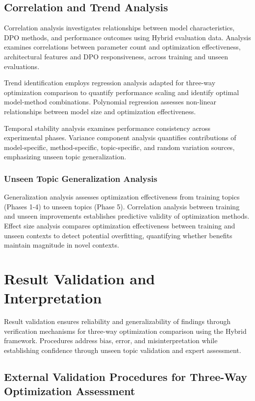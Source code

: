 \subsection{Correlation and Trend Analysis}

Correlation analysis investigates relationships between model characteristics, DPO methods, and performance outcomes using Hybrid evaluation data. Analysis examines correlations between parameter count and optimization effectiveness, architectural features and DPO responsiveness, across training and unseen evaluations.

Trend identification employs regression analysis adapted for three-way optimization comparison to quantify performance scaling and identify optimal model-method combinations. Polynomial regression assesses non-linear relationships between model size and optimization effectiveness.

Temporal stability analysis examines performance consistency across experimental phases. Variance component analysis quantifies contributions of model-specific, method-specific, topic-specific, and random variation sources, emphasizing unseen topic generalization.

\subsubsection{Unseen Topic Generalization Analysis}

Generalization analysis assesses optimization effectiveness from training topics (Phases 1-4) to unseen topics (Phase 5). Correlation analysis between training and unseen improvements establishes predictive validity of optimization methods. Effect size analysis compares optimization effectiveness between training and unseen contexts to detect potential overfitting, quantifying whether benefits maintain magnitude in novel contexts.

\section{Result Validation and Interpretation}
\label{sec:result-validation}

Result validation ensures reliability and generalizability of findings through verification mechanisms for three-way optimization comparison using the Hybrid framework. Procedures address bias, error, and misinterpretation while establishing confidence through unseen topic validation and expert assessment.

\subsection{External Validation Procedures for Three-Way Optimization Assessment}

